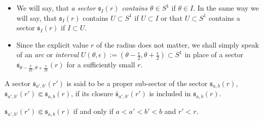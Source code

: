 \begin{rem}
  \begin{itemize}
    \item We will say, that \emph{a sector $\mathfrak{s}_{I}(r)$ contains
      $\theta\in S^1$} if $\theta\in I$. In the same way we will say, that
      $\mathfrak{s}_I(r)$ contains $U\subset S^1$ if $U\subset I$ or that
      $U\subset S^1$ contains a sector $\mathfrak{s}_I(r)$ if $I\subset U$.
    \item Since the explicit value $r$ of the radius does not matter, we shall
      simply speak of an \emph{arc} or \emph{interval}
      $U(\theta,\epsilon):=\left(\theta-\frac{\epsilon}{2}
      ,\theta+\frac{\epsilon}{2}\right)\subset S^1$ in place of a sector
      $\mathfrak{s}_{\theta-\frac{\pi}{2k},\theta+\frac{\pi}{2k}}(r)$ for a
      sufficiently small $r$. 
  \end{itemize}
\end{rem}
\begin{defn}
  A sector $\mathfrak{s}_{a',b'}(r')$ is said to be a proper sub-sector of the
  sector $\mathfrak{s}_{a,b}(r)$,
  $\mathfrak{s}_{a',b'}(r')\Subset\mathfrak{s}_{a,b}(r)$, if its closure
  $\bar{\mathfrak{s}}_{a',b'}(r')$ is included in $\mathfrak{s}_{a,b}(r)$.
  \begin{s-rem}
    $\mathfrak{s}_{a',b'}(r')\Subset\mathfrak{s}_{a,b}(r)$ if and only if
    $a<a'<b'<b$ and $r'<r$.
  \end{s-rem}
\end{defn}

